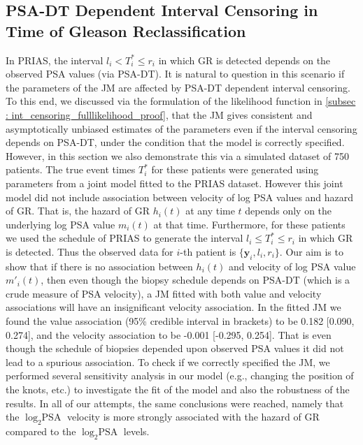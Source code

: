 \clearpage
\subsection{PSA-DT Dependent Interval Censoring in Time of Gleason Reclassification}
In PRIAS, the interval $l_i < T_i^* \leq r_i$ in which GR is detected depends on the observed PSA values (via PSA-DT). It is natural to question in this scenario if the parameters of the JM are affected by PSA-DT dependent interval censoring. To this end, we discussed via the formulation of the likelihood function in \ref{subsec : int_censoring_fulllikelihood_proof}, that the JM gives consistent and asymptotically unbiased estimates of the parameters even if the interval censoring depends on PSA-DT, under the condition that the model is correctly specified. However, in this section we also demonstrate this via a simulated dataset of 750 patients. The true event times $T^*_i$ for these patients were generated using parameters from a joint model fitted to the PRIAS dataset. However this joint model did not include association between velocity of log PSA values and hazard of GR. That is, the hazard of GR $h_i(t)$ at any time $t$ depends only on the underlying log PSA value $m_i(t)$ at that time. Furthermore, for these patients we used the schedule of PRIAS to generate the interval $l_i \leq T^*_i \leq r_i$ in which GR is detected. Thus the observed data for $i$-th patient is $\{\boldsymbol{y}_i, l_i, r_i\}$. Our aim is to show that if there is no association between $h_i(t)$ and velocity of log PSA value $m'_i(t)$, then even though the biopsy schedule depends on PSA-DT (which is a crude measure of PSA velocity), a JM fitted with both value and velocity associations will have an insignificant velocity association. In the fitted JM we found the value association (95\% credible interval in brackets) to be 0.182 [0.090, 0.274], and the velocity association to be -0.001 [-0.295, 0.254]. That is even though the schedule of biopsies depended upon observed PSA values it did not lead to a spurious association. To check if we correctly specified the JM, we performed several sensitivity analysis in our model (e.g., changing the position of the knots, etc.) to investigate the fit of the model and also the robustness of the results. In all of our attempts, the same conclusions were reached, namely that the $\log_2 \mbox{PSA}$ velocity is more strongly associated with the hazard of GR compared to the $\log_2 \mbox{PSA}$ levels.